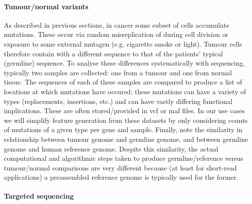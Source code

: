 \documentclass[thesis.tex]{subfiles}
\begin{document}
\paragraph{Tumour/normal variants}
As described in previous sections, in cancer some subset of cells accumulate mutations. These occur via random misreplication of  during cell division or exposure to some external mutagen (e.g. cigarette smoke or  light). Tumour cells therefore contain  with a different sequence to that of the patients' typical (germline) sequence. To analyse these differences systematically with sequencing, typically two samples are collected: one from a tumour and one from normal tissue. The sequences of each of these samples are compared to produce a list of locations at which mutations have occured: these mutations can have a variety of types (replacements, insertions, etc.) and can have vastly differing functional implications. These are often stored/provided in \gls{vcf} or \gls{maf} files. In our use cases we will simplify feature generation from these datasets by only considering counts of mutations of a given type per gene and sample. Finally, note the similarity in relationship between tumour genome and germline genome, and between germline genome and human reference genome. Despite this similarity, the actual computational and algorithmic steps taken to produce germline/reference versus tumour/normal comparisons are very different because (at least for short-read applications) a preassembled reference genome is typically used for the former.

\paragraph{Targeted sequencing}



\end{document}
